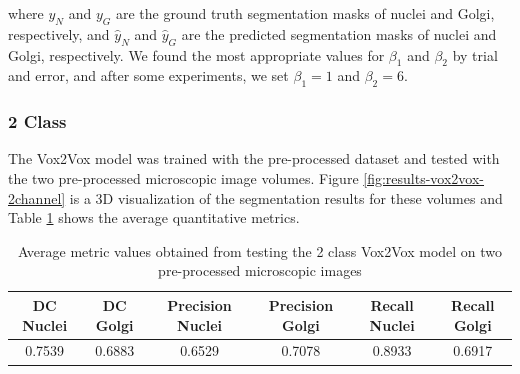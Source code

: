 \noindent where $y_N$ and $y_G$ are the ground truth segmentation masks of nuclei and Golgi, respectively, and $\hat{y}_N$ and $\hat{y}_G$ are the predicted segmentation masks of nuclei and Golgi, respectively. We found the most appropriate values for $\beta_1$ and $\beta_2$ by trial and error, and after some experiments, we set $\beta_1 = 1$ and $\beta_2 = 6$.


\subsubsection*{2 Class}

The Vox2Vox model was trained with the pre-processed dataset and tested with the two pre-processed microscopic image volumes. Figure \ref{fig:results-vox2vox-2channel} is a \ac{3D} visualization of the segmentation results for these volumes and Table \ref{tab:results-2class-vox2vox} shows the average quantitative metrics. 

\begin{table}[!htb]
\centering
\caption{Average metric values obtained from testing the 2 class Vox2Vox model on two pre-processed microscopic images}
\label{tab:results-2class-vox2vox}
\renewcommand\arraystretch{1.4}
\begin{tabular}{|c|c|c|c|c|c|}
\hline
DC  Nuclei & DC Golgi & Precision Nuclei & Precision Golgi & Recall Nuclei & Recall Golgi \\ \hline
0.7539     & 0.6883   & 0.6529           & 0.7078          & 0.8933        & 0.6917       \\ \hline
\end{tabular}%

\end{table}

